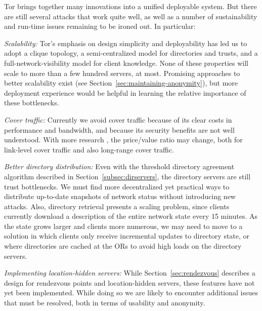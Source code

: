 \documentclass[times,10pt,twocolumn]{article}
\begin{document}
\label{sec:conclusion}

Tor brings together many innovations into
a unified deployable system. But there are still several attacks that
work quite well, as well as a number of sustainability and run-time
issues remaining to be ironed out. In particular:

%

\emph{Scalability:} Tor's emphasis on design simplicity and
deployability has led us to adopt a clique topology, a
semi-centralized model for directories and trusts, and a
full-network-visibility model for client knowledge.  None of these
properties will scale to more than a few hundred servers, at most.
Promising approaches to better scalability exist (see
Section~\ref{sec:maintaining-anonymity}), but more deployment
experience would be helpful in learning the relative importance of
these bottlenecks.

\emph{Cover traffic:} Currently we avoid cover traffic because
of its clear costs in performance and bandwidth, and because its
security benefits are not well understood. With more research
\cite{SS03,defensive-dropping}, the price/value ratio may change,
both for link-level cover traffic and also long-range cover traffic.

\emph{Better directory distribution:} Even with the threshold
directory agreement algorithm described in Section~\ref{subsec:dirservers},
the directory servers are still trust bottlenecks. We must find more
decentralized yet practical ways to distribute up-to-date snapshots of
network status without introducing new attacks.  Also, directory
retrieval presents a scaling problem, since clients currently
download a description of the entire network state every 15
minutes.  As the state grows larger and clients more numerous, we
may need to move to a solution in which clients only receive
incremental updates to directory state, or where directories are
cached at the ORs to avoid high loads on the directory servers.

\emph{Implementing location-hidden servers:} While
Section~\ref{sec:rendezvous} describes a design for rendezvous
points and location-hidden servers, these features have not yet been
implemented.  While doing so we are likely to encounter additional
issues that must be resolved, both in terms of usability and anonymity.
\end{document}
